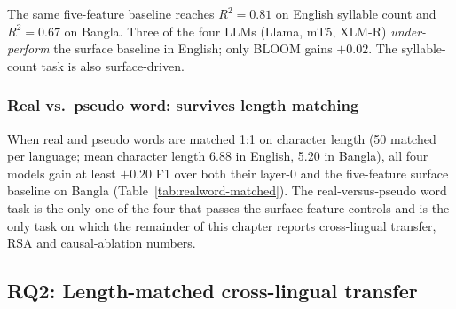 The same five-feature baseline reaches $R^2 = 0.81$ on English syllable count and $R^2 = 0.67$ on Bangla. Three of the four LLMs (Llama, mT5, XLM-R) \emph{under-perform} the surface baseline in English; only BLOOM gains $+0.02$. The syllable-count task is also surface-driven.

\subsubsection{Real vs.\ pseudo word: survives length matching}

When real and pseudo words are matched 1:1 on character length (50 matched per language; mean character length 6.88 in English, 5.20 in Bangla), all four models gain at least $+0.20$ F1 over both their layer-0 and the five-feature surface baseline on Bangla (Table~\ref{tab:realword-matched}). The real-versus-pseudo word task is the only one of the four that passes the surface-feature controls and is the only task on which the remainder of this chapter reports cross-lingual transfer, RSA and causal-ablation numbers.

\begin{table}[H]
\centering
\caption{Length-matched realword probing per language. EN/BN at layer 0 versus peak layer, with gain over L0. All four models gain $\geq +0.20$ F1 on Bangla; this is the only task that passes surface-feature controls.}
\label{tab:realword-matched}
\small
{}
\end{table}

\subsection{RQ2: Length-matched cross-lingual transfer}
\label{sec:rq2}

